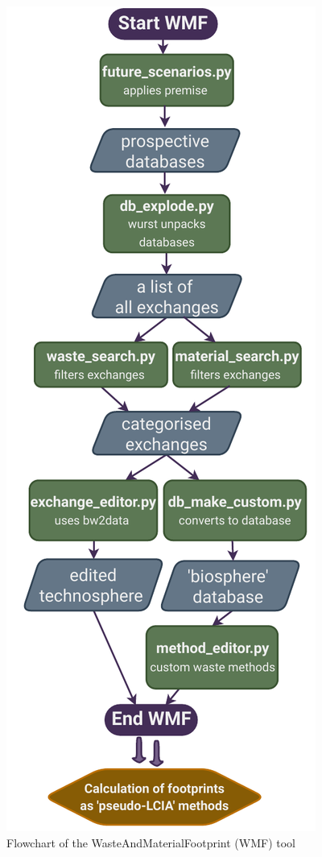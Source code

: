 \begin{figure}[h!]
    \centering
    \includegraphics[height=0.8\textheight]{figures/WMF_flowchart.pdf}
    \caption{Flowchart of the WasteAndMaterialFootprint (WMF) tool}\label{fig:WMF_flowchart}
\end{figure}

